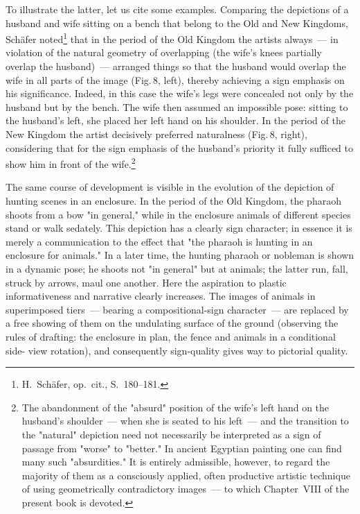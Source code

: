 To illustrate the latter, let us cite some examples. Comparing the depictions of a
husband and wife sitting on a bench that belong to the Old and New Kingdoms, Schäfer
noted\footnote{%
  H.~Schäfer, op.~cit., S.~180--181.}
that in the period of the Old Kingdom the artists always~--- in violation of the natural
geometry of overlapping (the wife's knees partially overlap the husband)~--- arranged
things so that the husband would overlap the wife in all parts of the image (Fig.\,8,
left), thereby achieving a sign emphasis on his significance. Indeed, in this case the
wife's legs were concealed not only by the husband but by the bench. The wife then
assumed an impossible pose: sitting to the husband's left, she placed her left hand on
his shoulder. In the period of the New Kingdom the artist decisively preferred
naturalness (Fig.\,8, right), considering that for the sign emphasis of the husband's
priority it fully sufficed to show him in front of the wife.\footnote{%
  The abandonment of the "absurd" position of the wife's left hand on the husband's
  shoulder~--- when she is seated to his left~--- and the transition to the "natural"
  depiction need not necessarily be interpreted as a sign of passage from "worse" to
  "better." In ancient Egyptian painting one can find many such "absurdities." It is
  entirely admissible, however, to regard the majority of them as a consciously applied,
  often productive artistic technique of using geometrically contradictory images~---
  to which Chapter~VIII of the present book is devoted.}

The same course of development is visible in the evolution of the depiction of hunting
scenes in an enclosure. In the period of the Old Kingdom, the pharaoh shoots from a
bow "in general," while in the enclosure animals of different species stand or walk
sedately. This depiction has a clearly sign character; in essence it is merely a
communication to the effect that "the pharaoh is hunting in an enclosure for animals."
In a later time, the hunting pharaoh or nobleman is shown in a dynamic pose; he shoots
not "in general" but at animals; the latter run, fall, struck by arrows, maul one another.
Here the aspiration to plastic informativeness and narrative clearly increases. The images
of animals in superimposed tiers~--- bearing a compositional-sign character~--- are
replaced by a free showing of them on the undulating surface of the ground (observing
the rules of drafting: the enclosure in plan, the fence and animals in a conditional side-
view rotation), and consequently sign-quality gives way to pictorial quality.

